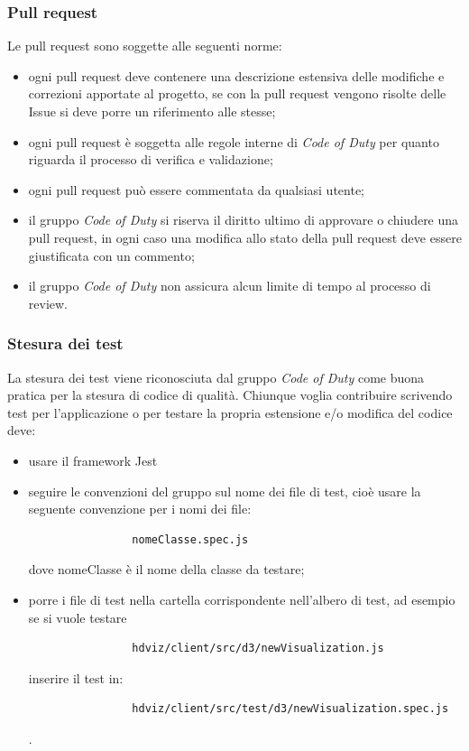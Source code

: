         \subsubsection{Pull request}
        Le pull request sono soggette alle seguenti norme:
        \begin{itemize}
            \item ogni pull request deve contenere una descrizione estensiva delle modifiche e correzioni apportate al progetto, se con la pull request vengono risolte delle Issue si deve porre un riferimento alle stesse;
            \item ogni pull request è soggetta alle regole interne di \textit{Code of Duty} per quanto riguarda il processo di verifica e validazione;
            \item ogni pull request può essere commentata da qualsiasi utente;
            \item il gruppo \textit{Code of Duty} si riserva il diritto ultimo di approvare o chiudere una pull request, in ogni caso una modifica allo stato della pull request deve essere giustificata con un commento;
            \item il gruppo \textit{Code of Duty} non assicura alcun limite di tempo al processo di review.
        \end{itemize}
        \subsubsection{Stesura dei test}
        La stesura dei test viene riconosciuta dal gruppo \textit{Code of Duty} come buona pratica per la stesura di codice di qualità. Chiunque voglia contribuire scrivendo test per l'applicazione o per testare la propria estensione e/o modifica del codice deve:
        \begin{itemize}
            \item usare il framework Jest
            \item seguire le convenzioni del gruppo sul nome dei file di test, cioè usare la seguente convenzione per i nomi dei file:
            \begin{verbatim}
                nomeClasse.spec.js
            \end{verbatim}
            dove nomeClasse è il nome della classe da testare;
            \item porre i file di test nella cartella corrispondente nell'albero di test, ad esempio se si vuole testare
            \begin{verbatim}
                hdviz/client/src/d3/newVisualization.js
            \end{verbatim}
            inserire il test in:
            \begin{verbatim}
                hdviz/client/src/test/d3/newVisualization.spec.js
            \end{verbatim}.
        \end{itemize}
